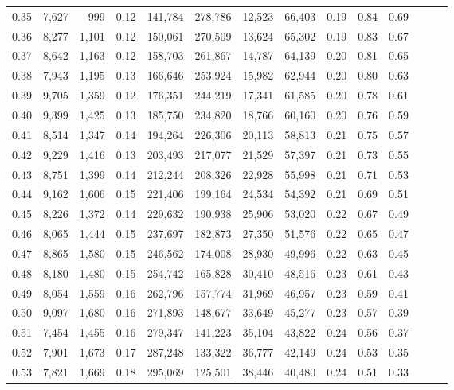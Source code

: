 \begin{tabular}{rrrrrrrrrrrrrr}
0.35 &  7,627 &    999 &  0.12 &  141,784 &  278,786 &  12,523 &  66,403 &  0.19 &  0.84 &      0.69 \\
0.36 &  8,277 &  1,101 &  0.12 &  150,061 &  270,509 &  13,624 &  65,302 &  0.19 &  0.83 &      0.67 \\
0.37 &  8,642 &  1,163 &  0.12 &  158,703 &  261,867 &  14,787 &  64,139 &  0.20 &  0.81 &      0.65 \\
0.38 &  7,943 &  1,195 &  0.13 &  166,646 &  253,924 &  15,982 &  62,944 &  0.20 &  0.80 &      0.63 \\
0.39 &  9,705 &  1,359 &  0.12 &  176,351 &  244,219 &  17,341 &  61,585 &  0.20 &  0.78 &      0.61 \\
0.40 &  9,399 &  1,425 &  0.13 &  185,750 &  234,820 &  18,766 &  60,160 &  0.20 &  0.76 &      0.59 \\
0.41 &  8,514 &  1,347 &  0.14 &  194,264 &  226,306 &  20,113 &  58,813 &  0.21 &  0.75 &      0.57 \\
0.42 &  9,229 &  1,416 &  0.13 &  203,493 &  217,077 &  21,529 &  57,397 &  0.21 &  0.73 &      0.55 \\
0.43 &  8,751 &  1,399 &  0.14 &  212,244 &  208,326 &  22,928 &  55,998 &  0.21 &  0.71 &      0.53 \\
0.44 &  9,162 &  1,606 &  0.15 &  221,406 &  199,164 &  24,534 &  54,392 &  0.21 &  0.69 &      0.51 \\
0.45 &  8,226 &  1,372 &  0.14 &  229,632 &  190,938 &  25,906 &  53,020 &  0.22 &  0.67 &      0.49 \\
0.46 &  8,065 &  1,444 &  0.15 &  237,697 &  182,873 &  27,350 &  51,576 &  0.22 &  0.65 &      0.47 \\
0.47 &  8,865 &  1,580 &  0.15 &  246,562 &  174,008 &  28,930 &  49,996 &  0.22 &  0.63 &      0.45 \\
0.48 &  8,180 &  1,480 &  0.15 &  254,742 &  165,828 &  30,410 &  48,516 &  0.23 &  0.61 &      0.43 \\
0.49 &  8,054 &  1,559 &  0.16 &  262,796 &  157,774 &  31,969 &  46,957 &  0.23 &  0.59 &      0.41 \\
0.50 &  9,097 &  1,680 &  0.16 &  271,893 &  148,677 &  33,649 &  45,277 &  0.23 &  0.57 &      0.39 \\
0.51 &  7,454 &  1,455 &  0.16 &  279,347 &  141,223 &  35,104 &  43,822 &  0.24 &  0.56 &      0.37 \\
0.52 &  7,901 &  1,673 &  0.17 &  287,248 &  133,322 &  36,777 &  42,149 &  0.24 &  0.53 &      0.35 \\
0.53 &  7,821 &  1,669 &  0.18 &  295,069 &  125,501 &  38,446 &  40,480 &  0.24 &  0.51 &      0.33 \\

\end{tabular}
